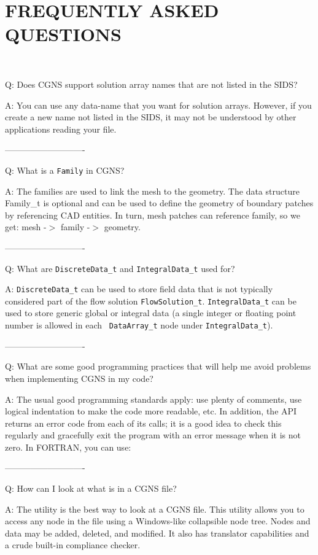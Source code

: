 \documentclass[12pt]{article}
\begin{document}
\newpage
\section{FREQUENTLY ASKED QUESTIONS} \label{sec:FAQ}

~

Q:  Does CGNS support solution array names that are not listed in the SIDS?

A:  You can use any data-name that you want for solution arrays.  However,
if you create a new name not listed in the SIDS, it may not be understood
by other applications reading your file.

----------------------------

Q:  What is a {\tt Family} in CGNS?

A:  The families are used to link the mesh to the geometry.  The data
structure Family\_t is optional and can be used to define the geometry
of boundary patches by referencing CAD entities.  In turn, mesh
patches can reference family, so we get:  mesh -$>$ family -$>$ geometry.

----------------------------

Q:  What are {\tt DiscreteData\_t} and {\tt IntegralData\_t} used for?

A: {\tt DiscreteData\_t} can be used to store field data that is not
typically considered part of the flow solution {\tt FlowSolution\_t}.
{\tt IntegralData\_t} can be used to store generic global or integral
data (a single integer or floating point number is allowed in each {\tt
DataArray\_t} node under {\tt IntegralData\_t}).

----------------------------

Q:  What are some good programming practices that will help me avoid
problems when implementing CGNS in my code?

A:  The usual good programming standards apply:  
use plenty of comments, use logical indentation to make the code more
readable, etc.  In addition, the API returns an error code from
each of its calls; it is a good idea to check this regularly and
gracefully exit the program with an error message when it is not
zero.  In FORTRAN, you can use:


----------------------------

Q:  How can I look at what is in a CGNS file?

A:  The utility  is the best way to look at a CGNS
file.  This utility allows you to access any node in the file using
a Windows-like collapsible node tree. Nodes and data may be added,
deleted, and modified.
It also has translator capabilities and a crude built-in compliance checker.
\end{document}
